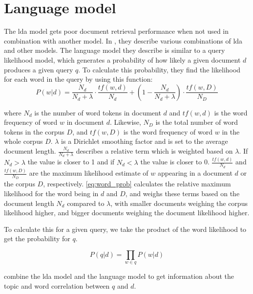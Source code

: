 \section{Language model}
The \gls{lda} model gets poor document retrieval performance when not used in combination with another model\cite{yang2009topic}.
In \cite{yang2009topic}, they describe various combinations of \gls{lda} and other models. 
The language model they describe is similar to a query likelihood model, which generates a probability of how likely a given document $d$ produces a given query $q$.
To calculate this probability, they find the likelihood for each word in the query by using this function:
\begin{equation}\label{eq:word_prob}
	P(w|d) = \frac{N_d}{N_d + \lambda} \cdot \frac{tf(w,d)}{N_d} + (1 - \frac{N_d}{N_d + \lambda}) \cdot \frac{tf(w,D)}{N_D}
\end{equation}

where $N_d$ is the number of word tokens in document $d$ and $tf(w,d)$ is the word frequency of word $w$ in document $d$. Likewise, $N_D$ is the total number of word tokens in the corpus $D$, and $tf(w,D)$ is the word frequency of word $w$ in the whole corpus $D$. $\lambda$ is a Dirichlet smoothing factor and is set to the average document length.
$ \frac{N_d}{N_d + \lambda} $ describes a relative term which is weighted based on $ \lambda $. If $N_d > \lambda$ the value is closer to 1 and if $ N_d < \lambda $ the value is closer to 0.
$ \frac{tf(w,d)}{N_d} $ and $\frac{tf(w,D)}{N_D}$ are the maximum likelihood estimate of $w$ appearing in a document $d$ or the corpus $D$, respectively.
\autoref{eq:word_prob} calculates the relative maximum likelihood for the word being in $ d $ and $ D $, and weighs these terms based on the document length $N_d$ compared to $\lambda$, with smaller documents weighing the corpus likelihood higher, and bigger documents weighing the document likelihood higher.

To calculate this for a given query, we take the product of the word likelihood to get the probability for $q$.

\begin{equation}\label{eq:query_prob}
	P(q|d) = \prod_{w \in q} P(w|d)
\end{equation}

\cite{yang2009topic} combine the \gls{lda} model and the language model to get information about the topic and word correlation between $q$ and $d$.
